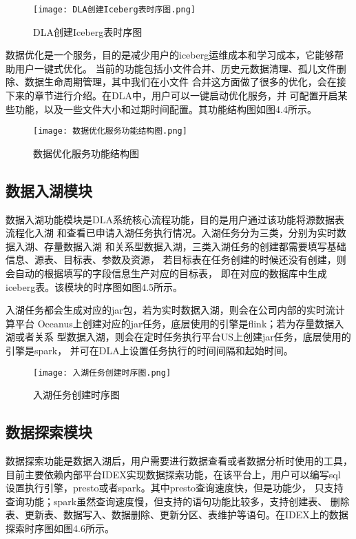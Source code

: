 \begin{figure}[h]
  \centering
  \texttt{[image: DLA创建Iceberg表时序图.png]}
  \caption{DLA创建Iceberg表时序图}
  \label{fig:badge}
\end{figure}

数据优化是一个服务，目的是减少用户的iceberg运维成本和学习成本，它能够帮助用户一键式优化。
当前的功能包括小文件合并、历史元数据清理、孤儿文件删除、数据生命周期管理，其中我们在小文件
合并这方面做了很多的优化，会在接下来的章节进行介绍。在DLA中，用户可以一键启动优化服务，并
可配置开启某些功能，以及一些文件大小和过期时间配置。其功能结构图如图4.4所示。

\begin{figure}[h]
  \centering
  \texttt{[image: 数据优化服务功能结构图.png]}
  \caption{数据优化服务功能结构图}
  \label{fig:badge}
\end{figure}

\subsection{数据入湖模块}

数据入湖功能模块是DLA系统核心流程功能，目的是用户通过该功能将源数据表流程化入湖
和查看已申请入湖任务执行情况。入湖任务分为三类，分别为实时数据入湖、存量数据入湖
和关系型数据入湖，三类入湖任务的创建都需要填写基础信息、源表、目标表、参数及资源，
若目标表在任务创建的时候还没有创建，则会自动的根据填写的字段信息生产对应的目标表，
即在对应的数据库中生成iceberg表。该模块的时序图如图4.5所示。

入湖任务都会生成对应的jar包，若为实时数据入湖，则会在公司内部的实时流计算平台
Oceanus上创建对应的jar任务，底层使用的引擎是flink；若为存量数据入湖或者关系
型数据入湖，则会在定时任务执行平台US上创建jar任务，底层使用的引擎是spark，
并可在DLA上设置任务执行的时间间隔和起始时间。

\begin{figure}[h]
  \centering
  \texttt{[image: 入湖任务创建时序图.png]}
  \caption{入湖任务创建时序图}
  \label{fig:badge}
\end{figure}

\subsection{数据探索模块}

数据探索功能是数据入湖后，用户需要进行数据查看或者数据分析时使用的工具，
目前主要依赖内部平台IDEX实现数据探索功能，在该平台上，用户可以编写sql
设置执行引擎，presto或者spark。其中presto查询速度快，但是功能少，
只支持查询功能；spark虽然查询速度慢，但支持的语句功能比较多，支持创建表、
删除表、更新表、数据写入、数据删除、更新分区、表维护等语句。在IDEX上的数据探索时序图如图4.6所示。

